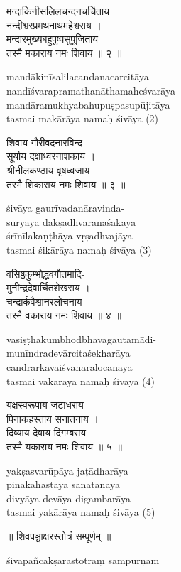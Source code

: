 \documentclass[twoside]{purana}
\begin{document}
\begin{sanskrit}
  मन्दाकिनीसलिलचन्दनचर्चिताय\\
  नन्दीश्वरप्रमथनाथमहेश्वराय ।\\
  मन्दारमुख्यबहुपुष्पसुपूजिताय\\
  तस्मै मकाराय नमः शिवाय ॥ २ ॥
\end{sanskrit}

mandākinīsalilacandanacarcitāya\\
nandīśvarapramathanāthamaheśvarāya\\
mandāramukhyabahupuṣpasupūjitāya\\
tasmai makārāya namaḥ śivāya (2)

\begin{sanskrit}
  शिवाय गौरीवदनारविन्द-\\
  सूर्याय दक्षाध्वरनाशकाय ।\\
  श्रीनीलकण्ठाय वृषध्वजाय\\
  तस्मै शिकाराय नमः शिवाय ॥ ३ ॥
\end{sanskrit}

śivāya gaurīvadanāravinda-\\
sūryāya dakṣādhvaranāśakāya\\
śrīnīlakaṇṭhāya vṛṣadhvajāya\\
tasmai śikārāya namaḥ śivāya (3)

\begin{sanskrit}
  वसिष्ठकुम्भोद्भवगौतमादि-\\
  मुनीन्द्रदेवार्चितशेखराय ।\\
  चन्द्रार्कवैश्वानरलोचनाय\\
  तस्मै वकाराय नमः शिवाय ॥ ४ ॥
\end{sanskrit}

vasiṣṭhakumbhodbhavagautamādi-\\
munīndradevārcitaśekharāya\\
candrārkavaiśvānaralocanāya\\
tasmai vakārāya namaḥ śivāya (4)

\begin{sanskrit}
  यक्षस्वरूपाय जटाधराय\\
  पिनाकहस्ताय सनातनाय ।\\
  दिव्याय देवाय दिगम्बराय\\
  तस्मै यकाराय नमः शिवाय ॥ ५ ॥
\end{sanskrit}

yakṣasvarūpāya jaṭādharāya\\
pinākahastāya sanātanāya\\
divyāya devāya digambarāya\\
tasmai yakārāya namaḥ śivāya (5)

\begin{sanskrit}
  ॥ शिवपञ्चाक्षरस्तोत्रं सम्पूर्णम् ॥\\
\end{sanskrit}
śivapañcākṣarastotraṃ sampūrṇam
\end{document}
